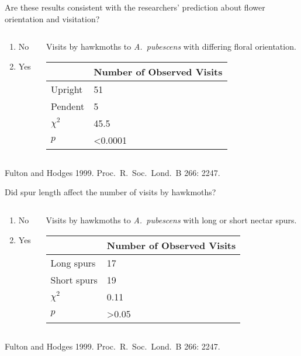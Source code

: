 \documentclass[t,hidelinks]{beamer}
\newcommand{\ques}[1]{\highlight{\textsc{q#1:}}}
\begin{document}
\begin{frame}[t]{\ques{6} Are these results consistent with the researchers’ prediction about flower orientation and visitation?}
	
	\begin{columns}[t]
		\begin{column}{0.28\textwidth}
			\begin{enumerate}
				\item No
				\item \alert<2>{Yes}
			\end{enumerate}
		\end{column}
		\begin{column}{0.5\textwidth}
	Visits by hawkmoths to \textit{A.~pubescens} with differing floral orientation.
	
			\begin{tabular}{L{0.6in}R{1in}}
				\toprule
				& Number of Observed Visits \tabularnewline
				\midrule
				Upright		&	51	 \tabularnewline
				Pendent		&	5	 \tabularnewline
				$\chi^2$	&	45.5 \tabularnewline
				$p$			&  \textless0.0001 \tabularnewline
				\bottomrule
			\end{tabular}
		\end{column}
	\end{columns}

	\vfilll
	
	\hfill \tiny Fulton and Hodges 1999. Proc.~R.~Soc.~Lond.~B 266: 2247.

\end{frame}
%
\begin{frame}[t]{\ques{7} Did spur length affect the number of visits by hawkmoths?}
	
	\begin{columns}[t]
		\begin{column}{0.28\textwidth}
			\begin{enumerate}
				\item \alert<2>{No}
				\item Yes
			\end{enumerate}
		\end{column}
		\begin{column}{0.5\textwidth}
			Visits by hawkmoths to \textit{A.~pubescens} with long or short nectar spurs.
			
			\begin{tabular}{L{0.75in}R{1in}}
				\toprule
				& Number of Observed Visits \tabularnewline
				\midrule
				Long spurs		&	17	 \tabularnewline
				Short spurs		&	19	 \tabularnewline
				$\chi^2$		&	0.11 \tabularnewline
				$p$				&  \textgreater0.05 \tabularnewline
				\bottomrule
			\end{tabular}
		\end{column}
	\end{columns}

	\vfilll
	
	\hfill \tiny Fulton and Hodges 1999. Proc.~R.~Soc.~Lond.~B 266: 2247.

\end{frame}
\end{document}
